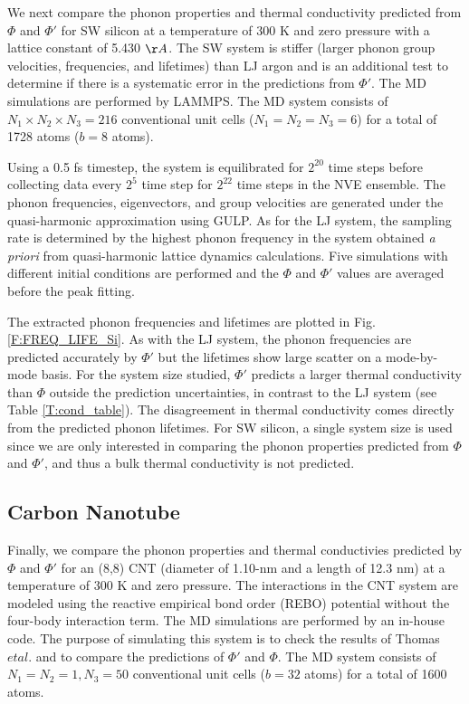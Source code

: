 \documentclass[letterpaper,12pt]{article}
\begin{document}
We next compare the phonon properties and thermal conductivity predicted from $\Phi$ and $\Phi'$ for SW silicon \cite{stillinger1985} at a temperature of $300$ K and zero pressure with a lattice constant of 5.430 $\AA$. The SW system is stiffer (larger phonon group velocities, frequencies, and lifetimes) than LJ argon and is an additional test to determine if there is a systematic error in the predictions from $\Phi'$. The MD simulations are performed by LAMMPS.\cite{LAMMPS} The MD system consists
of $N_1 \times N_2 \times N_3=216$ conventional unit cells ($N_1=N_2=N_3=6$) for a total of 1728 atoms ($b=8$ atoms).

Using a 0.5 fs timestep, the system is equilibrated for $2^{20}$ time steps before collecting data every $2^5$ time step for $2^{22}$ time steps in the NVE ensemble.\cite{mcquarrie2000} The phonon frequencies, eigenvectors, and group velocities are generated under the quasi-harmonic approximation using GULP.\cite{GULP} As for the LJ system, the sampling rate is determined by the highest phonon frequency in the system obtained {\em a priori} from quasi-harmonic lattice dynamics calculations. Five simulations with different initial conditions are performed and the $\Phi$ and $\Phi'$ values are averaged before the peak fitting.

The extracted phonon frequencies and lifetimes are plotted in Fig. \ref{F:FREQ_LIFE_Si}. As with the LJ system, the phonon frequencies are predicted accurately by $\Phi'$ but the lifetimes show large scatter on a mode-by-mode basis. For the system size studied, $\Phi'$ predicts a larger thermal conductivity than $\Phi$ outside the prediction uncertainties, in contrast to the LJ system (see Table \ref{T:cond_table}). The disagreement in thermal conductivity comes directly from the predicted phonon lifetimes. For SW silicon, a single system size is used since we are only interested in comparing the phonon properties predicted from $\Phi$ and $\Phi'$, and thus a bulk thermal conductivity is not predicted.

\subsection{\label{S:Subsection_prop_CNT}Carbon Nanotube}

Finally, we compare the phonon properties and thermal conductivies predicted by $\Phi$ and $\Phi'$ for an (8,8) CNT (diameter of 1.10-nm and a length of 12.3 nm) at a temperature of $300$ K and zero pressure.\cite{thomas2010c} The interactions in the CNT system are modeled using the reactive empirical
bond order (REBO) potential without the four-body interaction term.\cite{brenner2002} The MD simulations are performed by an in-house code.\cite{thomas2010c} The purpose of simulating this system is to check the results of Thomas $et al.$\cite{thomas2010c} and to compare the predictions of $\Phi'$ and $\Phi$. The MD system consists of $N_1 = N_2 = 1, N_3 = 50$ conventional unit cells ($b=32$ atoms) for a total of 1600 atoms.
\end{document}
